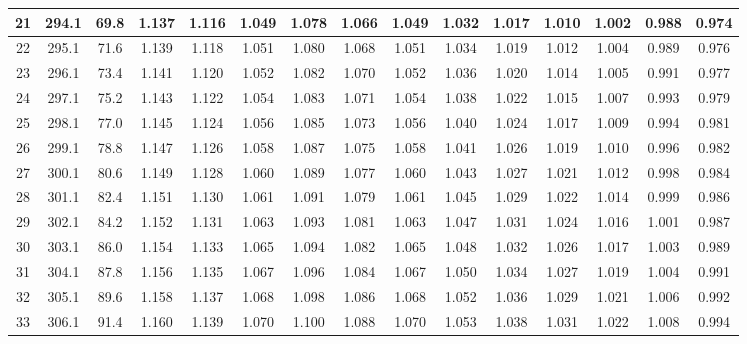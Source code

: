 \documentclass[12pt,a4paper,twoside]{article}
\begin{document}
\begin{center}
\begin{longtable}{ c c c | c c c c c c c c c c c c}
 21 & 294.1 & 69.8 & 1.137 & 1.116 & 1.049 & 1.078 & 1.066 & 1.049 & 1.032 & 1.017 & 1.010 & 1.002 & 0.988 & 0.974 \\ \hline   
 
 22 & 295.1 & 71.6 & 1.139 & 1.118 & 1.051 & 1.080 & 1.068 & 1.051 & 1.034 & 1.019 & 1.012 & 1.004 & 0.989 & 0.976 \\ \hline   
 
 23 & 296.1 & 73.4 & 1.141 & 1.120 & 1.052 & 1.082 & 1.070 & 1.052 & 1.036 & 1.020 & 1.014 & 1.005 & 0.991 & 0.977 \\ \hline   
 
 24 & 297.1 & 75.2 & 1.143 & 1.122 & 1.054 & 1.083 & 1.071 & 1.054 & 1.038 & 1.022 & 1.015 & 1.007 & 0.993 & 0.979 \\ \hline   
 
 25 & 298.1 & 77.0 & 1.145 & 1.124 & 1.056 & 1.085 & 1.073 & 1.056 & 1.040 & 1.024 & 1.017 & 1.009 & 0.994 & 0.981 \\ \hline   
 
 26 & 299.1 & 78.8 & 1.147 & 1.126 & 1.058 & 1.087 & 1.075 & 1.058 & 1.041 & 1.026 & 1.019 & 1.010 & 0.996 & 0.982 \\ \hline   
 
 27 & 300.1 & 80.6 & 1.149 & 1.128 & 1.060 & 1.089 & 1.077 & 1.060 & 1.043 & 1.027 & 1.021 & 1.012 & 0.998 & 0.984 \\ \hline   
 
 28 & 301.1 & 82.4 & 1.151 & 1.130 & 1.061 & 1.091 & 1.079 & 1.061 & 1.045 & 1.029 & 1.022 & 1.014 & 0.999 & 0.986 \\ \hline   
 
 29 & 302.1 & 84.2 & 1.152 & 1.131 & 1.063 & 1.093 & 1.081 & 1.063 & 1.047 & 1.031 & 1.024 & 1.016 & 1.001 & 0.987 \\ \hline   
 
 30 & 303.1 & 86.0 & 1.154 & 1.133 & 1.065 & 1.094 & 1.082 & 1.065 & 1.048 & 1.032 & 1.026 & 1.017 & 1.003 & 0.989 \\ \hline   
 
 31 & 304.1 & 87.8 & 1.156 & 1.135 & 1.067 & 1.096 & 1.084 & 1.067 & 1.050 & 1.034 & 1.027 & 1.019 & 1.004 & 0.991 \\ \hline   
 
 32 & 305.1 & 89.6 & 1.158 & 1.137 & 1.068 & 1.098 & 1.086 & 1.068 & 1.052 & 1.036 & 1.029 & 1.021 & 1.006 & 0.992 \\ \hline   
 
 33 & 306.1 & 91.4 & 1.160 & 1.139 & 1.070 & 1.100 & 1.088 & 1.070 & 1.053 & 1.038 & 1.031 & 1.022 & 1.008 & 0.994 \\ \hline   
 

\end{longtable}
\end{center}
\end{document}
